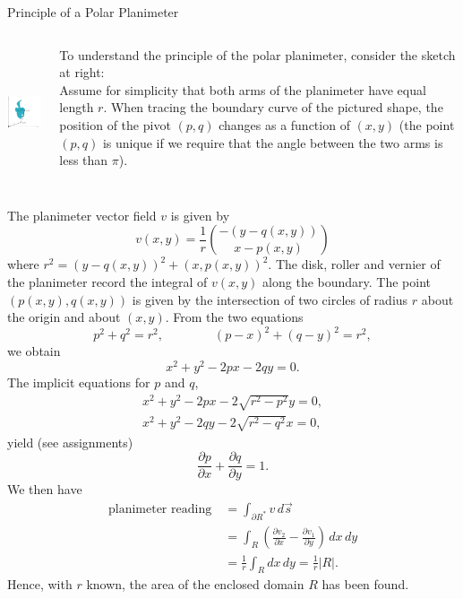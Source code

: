 \documentclass[smaller,hyperref={CJKbookmarks=true}]{beamer}
\begin{document}
\begin{frame}{Principle of a Polar Planimeter}
\begin{spacing}{1}
\begin{columns}[onlytextwidth]
\begin{column}{0.4\textwidth}
\includegraphics[width=\columnwidth,height=110pt]{94.jpg}
\end{column}
\begin{column}{0.6\textwidth}
To understand the principle of the polar
planimeter, consider the sketch at right:\\[5pt]
Assume for simplicity that both arms of
the planimeter have equal length $r$. When
tracing the boundary curve of the pictured
shape, the position of the pivot $(p, q)$
changes as a function of $(x, y)$ (the point
$(p, q)$ is unique if we require that the angle
between the two arms is less than $\pi$).
\end{column}
\end{columns}
The planimeter vector field $v$ is given by
\[v(x,y)=\frac{1}{r}\binom{-(y-q(x,y))}{x-p(x,y)}\]
where $r^2=(y-q(x,y))^2+(x,p(x,y))^2$. The disk, roller and vernier of the planimeter record the integral of $v(x,y)$ along the boundary.
\newpage
The point $(p(x,y),q(x,y))$ is given by the intersection of two circles of radius $r$ about the origin and about $(x,y)$. From the two equations
\[p^2+q^2=r^2,\qquad\qquad
(p-x)^2+(q-y)^2=r^2,\]
we obtain
\[x^2+y^2-2px-2qy=0.\]
The implicit equations for $p$ and $q$,
\begin{eqnarray*}
  x^2+y^2-2px-2\sqrt{r^2-p^2}y=0, \\
  x^2+y^2-2qy-2\sqrt{r^2-q^2}x=0,
\end{eqnarray*}
yield (see assignments)
\[\frac{\partial p}{\partial x}+\frac{\partial q}{\partial y}=1.\]
\newpage
\vspace*{16pt}
We then have
\begin{equation*}
  \begin{split}
     \text{planimeter reading}~&=\int_{\partial R^*}v\,d\vec{s} \\
       &=\int_R\left(\frac{\partial v_2}{\partial x}-\frac{\partial v_1}{\partial y}\right)\,dx\,dy  \\
       &=\frac{1}{r}\int_Rdx\,dy=\frac{1}{r}|R|.
  \end{split}
\end{equation*}
Hence, with $r$ known, the area of the enclosed domain $R$ has been found.
\end{spacing}
\end{frame}
\end{document}
